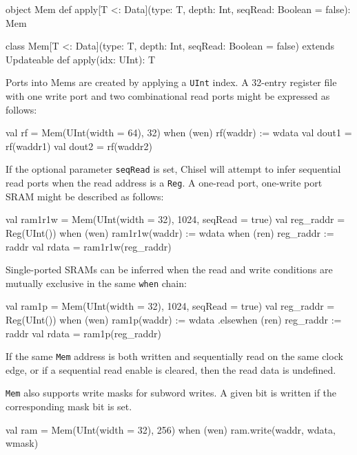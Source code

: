 \documentclass[twocolumn,10pt]{article}
\def\code#1{{\tt #1}}
\begin{document}
\begin{scala}
object Mem {
  def apply[T <: Data](type: T, depth: Int, 
          seqRead: Boolean = false): Mem
}

class Mem[T <: Data](type: T, depth: Int,
      seqRead: Boolean = false)
    extends Updateable {
  def apply(idx: UInt): T
}
\end{scala}

Ports into Mems are created by applying a \code{UInt} index.  A 32-entry
register file with one write port and two combinational read ports might be
expressed as follows:

\begin{scala}
val rf = Mem(UInt(width = 64), 32)
when (wen) { rf(waddr) := wdata }
val dout1 = rf(waddr1)
val dout2 = rf(waddr2)
\end{scala}

If the optional parameter \code{seqRead} is set, Chisel will attempt to infer
sequential read ports when the read address is a \code{Reg}.  A one-read port,
one-write port SRAM might be described as follows:

\begin{scala}
val ram1r1w =
  Mem(UInt(width = 32), 1024, seqRead = true)
val reg_raddr = Reg(UInt())
when (wen) { ram1r1w(waddr) := wdata }
when (ren) { reg_raddr := raddr }
val rdata = ram1r1w(reg_raddr)
\end{scala}

Single-ported SRAMs can be inferred when the read and write conditions are
mutually exclusive in the same \code{when} chain:

\begin{scala}
val ram1p = 
  Mem(UInt(width = 32), 1024, seqRead = true)
val reg_raddr = Reg(UInt())
when (wen) { ram1p(waddr) := wdata }
.elsewhen (ren) { reg_raddr := raddr }
val rdata = ram1p(reg_raddr)
\end{scala}

If the same \code{Mem} address is both written and sequentially read on the same clock
edge, or if a sequential read enable is cleared, then the read data is
undefined.

\code{Mem} also supports write masks for subword writes.  A given bit is written if
the corresponding mask bit is set.

\begin{scala}
val ram = Mem(UInt(width = 32), 256)
when (wen) { ram.write(waddr, wdata, wmask) }
\end{scala}


% 
% 
\end{document}
